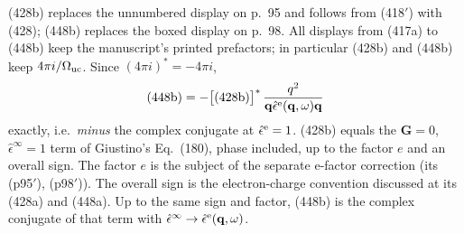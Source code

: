 (428b) replaces the unnumbered display on p.~95 and follows from (418$'$) with (428); (448b) replaces the boxed display on p.~98. All displays from (417a) to (448b) keep the manuscript's printed prefactors; in particular (428b) and (448b) keep $4\pi i/\Omega_{\rm uc}$. Since $(4\pi i)^*=-4\pi i$,
\begin{equation*}
(448\text{b})=-\big[(428\text{b})\big]^*\,\frac{q^2}{\mathbf q\hat\epsilon^{\rm e}(\mathbf q,\omega)\mathbf q}
\end{equation*}
exactly, i.e.\ \emph{minus} the complex conjugate at $\hat\epsilon^{\rm e}=1$. (428b) equals the $\mathbf G=0$, $\hat\epsilon^\infty=1$ term of Giustino's Eq.~(180), phase included, up to the factor $e$ and an overall sign. The factor $e$ is the subject of the separate e-factor correction (its (p95$'$), (p98$'$)). The overall sign is the electron-charge convention discussed at its (428a) and (448a). Up to the same sign and factor, (448b) is the complex conjugate of that term with $\hat\epsilon^\infty\to\hat\epsilon^{\rm e}(\mathbf q,\omega)$.

